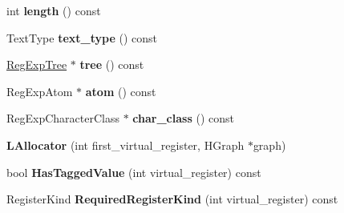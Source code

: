 \begin{DoxyCompactItemize}
\item 
\hypertarget{classv8_1_1internal_1_1_b_a_s_e___e_m_b_e_d_d_e_d_aaf57eaaeae1bbeb27a8d033b1b889f3c}{}int {\bfseries length} () const \label{classv8_1_1internal_1_1_b_a_s_e___e_m_b_e_d_d_e_d_aaf57eaaeae1bbeb27a8d033b1b889f3c}

\item 
\hypertarget{classv8_1_1internal_1_1_b_a_s_e___e_m_b_e_d_d_e_d_ab9bcb8b02ca4979cda9b864b2f154478}{}Text\+Type {\bfseries text\+\_\+type} () const \label{classv8_1_1internal_1_1_b_a_s_e___e_m_b_e_d_d_e_d_ab9bcb8b02ca4979cda9b864b2f154478}

\item 
\hypertarget{classv8_1_1internal_1_1_b_a_s_e___e_m_b_e_d_d_e_d_ace2e17e4d3c9fc1502f527e83da5bc5c}{}\hyperlink{classv8_1_1internal_1_1_reg_exp_tree}{Reg\+Exp\+Tree} $\ast$ {\bfseries tree} () const \label{classv8_1_1internal_1_1_b_a_s_e___e_m_b_e_d_d_e_d_ace2e17e4d3c9fc1502f527e83da5bc5c}

\item 
\hypertarget{classv8_1_1internal_1_1_b_a_s_e___e_m_b_e_d_d_e_d_a1a107bcb7b5719406b25c3343f754e3c}{}Reg\+Exp\+Atom $\ast$ {\bfseries atom} () const \label{classv8_1_1internal_1_1_b_a_s_e___e_m_b_e_d_d_e_d_a1a107bcb7b5719406b25c3343f754e3c}

\item 
\hypertarget{classv8_1_1internal_1_1_b_a_s_e___e_m_b_e_d_d_e_d_a925aa03ed5fa5525883975c940598dc0}{}Reg\+Exp\+Character\+Class $\ast$ {\bfseries char\+\_\+class} () const \label{classv8_1_1internal_1_1_b_a_s_e___e_m_b_e_d_d_e_d_a925aa03ed5fa5525883975c940598dc0}

\item 
\hypertarget{classv8_1_1internal_1_1_b_a_s_e___e_m_b_e_d_d_e_d_a8a847b54317b83763d0fecddca1f78da}{}{\bfseries L\+Allocator} (int first\+\_\+virtual\+\_\+register, H\+Graph $\ast$graph)\label{classv8_1_1internal_1_1_b_a_s_e___e_m_b_e_d_d_e_d_a8a847b54317b83763d0fecddca1f78da}

\item 
\hypertarget{classv8_1_1internal_1_1_b_a_s_e___e_m_b_e_d_d_e_d_a9df42fce71b6ad7415cc40dbf5789e19}{}bool {\bfseries Has\+Tagged\+Value} (int virtual\+\_\+register) const \label{classv8_1_1internal_1_1_b_a_s_e___e_m_b_e_d_d_e_d_a9df42fce71b6ad7415cc40dbf5789e19}

\item 
\hypertarget{classv8_1_1internal_1_1_b_a_s_e___e_m_b_e_d_d_e_d_aae14b0cb0ab38e96a6df8f5253df5997}{}Register\+Kind {\bfseries Required\+Register\+Kind} (int virtual\+\_\+register) const \label{classv8_1_1internal_1_1_b_a_s_e___e_m_b_e_d_d_e_d_aae14b0cb0ab38e96a6df8f5253df5997}


\end{DoxyCompactItemize}
